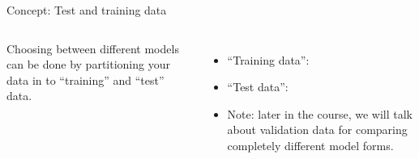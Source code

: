 \documentclass[aspectratio=169, handout]{beamer}
\begin{document}
\begin{frame}{Concept:  Test and training data}


\begin{columns}


Choosing between different models can be done by partitioning your data in to ``training'' and ``test'' data.

\begin{itemize}
\item ``Training data'': 

\hspace{5mm}

\item ``Test data'': 

\hspace{5mm}

\item<3-> Note: later in the course, we will talk about validation data for comparing completely different model forms.

\end{itemize}

\end{columns}


\end{frame}
\end{document}
